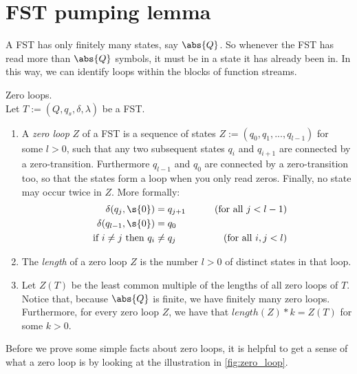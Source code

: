 \section{FST pumping lemma}

A FST has only finitely many states, say $\abs{Q}$. So whenever the FST has read more than $\abs{Q}$ symbols, it must be in a state it has already been in. In this way, we can identify loops within the blocks of function streams.

\begin{definition}{Zero loops.}\label{def_zero_loop}\hfill\\
	Let $T:=(Q,q_s,\delta,\lambda)$ be a FST.
	\begin{enumerate}
		\item A \textit{zero loop} $Z$ of a FST is a sequence of states $Z := (q_0,q_1,...,q_{l-1})$ for some $l>0$, such that any two subsequent states $q_i$ and $q_{i+1}$ are connected by a zero-transition. Furthermore $q_{l-1}$ and $q_0$ are connected by a zero-transition too, so that the states form a loop when you only read zeros. Finally, no state may occur twice in $Z$. More formally:
		\begin{align}
			\qquad \delta(q_j,\s{0})&=q_{j+1} \qquad &(\text{for all } j < l-1 )\\
			\delta(q_{l-1},\s{0})&=q_{0}\\
 			\text{if } i\neq j \text{ then } q_i &\neq q_j \qquad &(\text{for all } i,j<l )
		\end{align}
		\item The \textit{length} of a zero loop $Z$ is the number $l>0$ of distinct states in that loop.
		\item Let $Z(T)$ be the least common multiple of the lengths of all zero loops of $T$. Notice that, because $\abs{Q}$ is finite, we have finitely many zero loops. Furthermore, for every zero loop $Z$, we have that $length(Z)*k = Z(T)$ for some $k>0$.
	\end{enumerate}
\end{definition}

Before we prove some simple facts about zero loops, it is helpful to get a sense of what a zero loop is by looking at the illustration in \cref{fig:zero_loop}.

